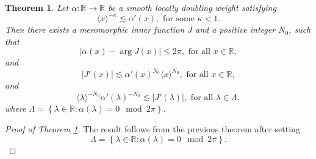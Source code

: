 \documentclass[10pt,a4paper]{amsart}
\newtheorem{theorem}{Theorem}
\begin{document}
    \begin{theorem}\label{thm:main}
        Let $\alpha : \mathbb{R} \to \mathbb{R}$ be a smooth locally doubling weight satisfying
        \begin{equation*}
                \langle x \rangle^{-\kappa} \lesssim \alpha'(x), \text{ for some } \kappa < 1.
        \end{equation*}
        Then there exists a meromorphic inner function $J$ and a positive integer $N_{0}$, such that
        \begin{equation*}
            \lvert \alpha(x) -\arg J(x) \rvert \leq 2\pi, \text{ for all } x \in \mathbb{R},
        \end{equation*}
        and
        \begin{equation*}
            \lvert J'(x) \rvert \lesssim \alpha'(x)^{N_{0}}\langle x \rangle^{N_{0}}, \text{ for all }x \in \mathbb{R},
        \end{equation*}
        and
        \begin{equation*}
            \langle \lambda \rangle^{-N_{0}}\alpha'(\lambda)^{-N_{0}} \lesssim \lvert J'(\lambda) \rvert, \text{ for all } \lambda \in \Lambda,
        \end{equation*}
        where $\Lambda = \left\{ \lambda \in \mathbb{R} : \alpha(\lambda) = 0 \mod 2\pi\right\}$.
    \end{theorem}

    \begin{proof}[Proof of Theorem \ref{thm:main}]
            The result follows from the previous theorem after setting
            \begin{equation*}
                \Lambda = \left\{ \lambda \in \mathbb{R} : \alpha(\lambda) = 0 \mod 2\pi \right\}.
            \end{equation*}
    \end{proof}
\end{document}
